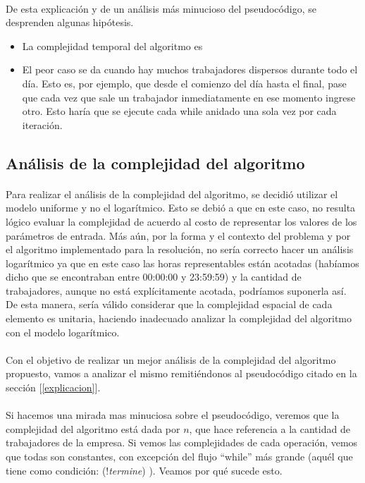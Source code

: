 \paragraph{}
De esta explicación y de un análisis más minucioso del pseudocódigo, se desprenden algunas hipótesis.
\begin{itemize}
	\item La complejidad temporal del algoritmo es 
	\item El peor caso se da cuando hay muchos trabajadores dispersos durante todo el día. Esto es, por ejemplo, que desde el comienzo del día hasta el final, pase que cada vez que sale un trabajador inmediatamente en ese momento ingrese otro. Esto haría que se ejecute cada while anidado una sola vez por cada iteración.
\end{itemize}


\subsection{Análisis de la complejidad del algoritmo}

\paragraph{}
Para realizar el análisis de la complejidad del algoritmo, se decidió utilizar el modelo uniforme y no el logarítmico. Esto se debió a que en este caso, no resulta lógico evaluar la complejidad de acuerdo al costo de representar los valores de los parámetros de entrada. Más aún, por la forma y el contexto del problema y por el algoritmo implementado para la resolución, no sería correcto hacer un análisis logarítmico ya que en este caso las horas representables están acotadas (habíamos dicho que se encontraban entre 00:00:00 y 23:59:59) y la cantidad de trabajadores, aunque no está explícitamente acotada, podríamos suponerla así. De esta manera, sería válido considerar que la complejidad espacial de cada elemento es unitaria, haciendo inadecuado analizar la complejidad del algoritmo con el modelo logarítmico.

\paragraph{}
Con el objetivo de realizar un mejor análisis de la complejidad del algoritmo propuesto, vamos a analizar el mismo remitiéndonos al pseudocódigo citado en la sección [\ref{explicacion}].

\paragraph{}
Si hacemos una mirada mas minuciosa sobre el pseudocódigo, veremos que la complejidad del algoritmo está dada por $n$, que hace referencia a la cantidad de trabajadores de la empresa. Si vemos las complejidades de cada operación, vemos que todas son constantes, con excepción del flujo ``while'' más grande (aquél que tiene como condición: (!\textit{termine}) ). Veamos por qué sucede esto.

